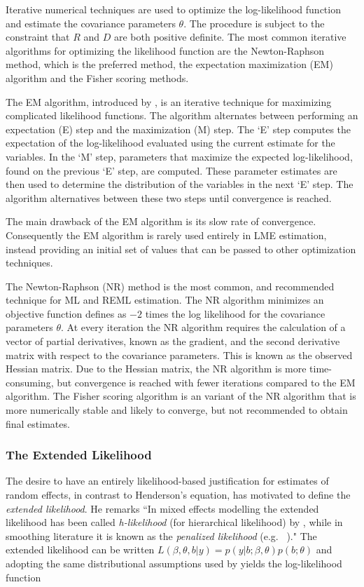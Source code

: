 \documentclass[12pt, a4paper]{report}
\theoremstyle{plain}
\theoremstyle{definition}
\theoremstyle{remark}
\begin{document}
Iterative numerical techniques are used to optimize the log-likelihood function and estimate the covariance parameters $\theta$. The procedure is subject to the constraint that $R$ and $D$ are both positive definite. The most common iterative algorithms for optimizing the likelihood function are the Newton-Raphson method, which is the preferred method, the expectation maximization (EM) algorithm and the Fisher scoring methods.

The EM algorithm, introduced by \citet{EM}, is an iterative technique for maximizing complicated likelihood functions. The algorithm alternates between performing an expectation (E) step and the maximization (M) step. The `E' step computes the expectation of the log-likelihood evaluated using the current estimate for the variables. In the `M' step, parameters that maximize the expected log-likelihood, found on the previous `E' step, are computed. These parameter estimates are then used to determine the distribution of the variables in the next `E' step. The algorithm alternatives between these two steps until convergence is reached.

The main drawback of the EM algorithm is its slow rate of convergence. Consequently the EM algorithm is rarely used entirely in LME estimation, instead providing an initial set of values that can be passed to other optimization techniques.

The Newton-Raphson (NR) method is the most common, and recommended technique for ML and REML estimation. The NR algorithm minimizes an objective function defines as $-2$ times the log likelihood for the covariance parameters $\theta$. At every iteration the NR algorithm requires the calculation of a vector of partial derivatives, known as the gradient, and the second derivative matrix with respect to the covariance parameters. This is known as the observed Hessian matrix. Due to the Hessian matrix, the NR algorithm is more time-consuming, but convergence is reached with fewer iterations compared to the EM algorithm. The Fisher scoring algorithm is an variant of the NR algorithm that is more numerically stable and likely to converge, but not recommended to obtain final estimates.

\subsubsection{The Extended Likelihood}

The desire to have an entirely likelihood-based justification for estimates of random effects, in contrast to Henderson's equation, has motivated \citet[page 429]{Pawi:in:2001} to define the \emph{extended likelihood}. He remarks ``In mixed effects modelling the extended likelihood has been called \emph{h-likelihood} (for hierarchical  likelihood) by \cite{Lee:Neld:hier:1996}, while in smoothing literature it is known as the \emph{penalized likelihood} (e.g.\ \citeauthor{Gree:Silv:nonp:1994} \citeyear{Gree:Silv:nonp:1994})." The extended likelihood can be written $L(\beta,\theta,b|y) = p(y|b;\beta,\theta) p(b;\theta)$ and adopting the same distributional assumptions used by \cite{Henderson:1950} yields the log-likelihood function
\end{document}
